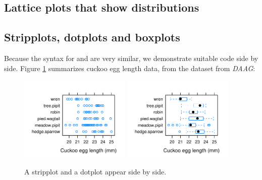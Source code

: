 \subsection{Lattice plots that show distributions}\label{sec:dists}

\subsection*{Stripplots, dotplots and boxplots}\label{ss:stripetc}

Because the syntax for  and  are
very similar, we demonstrate suitable code side by side.  Figure
\ref{fig:strip-bw} summarizes cuckoo egg length data, from the
dataset  from \textit{DAAG}:
\vspace*{-9pt}

\begin{figure}
\begin{Schunk}


\centerline{\includegraphics[width=0.47\textwidth]{figs/09-strip-bw-1} \includegraphics[width=0.47\textwidth]{figs/09-strip-bw-2} }

\end{Schunk}
\caption{A stripplot and a dotplot appear side by side.\label{fig:strip-bw}}
\end{figure}

